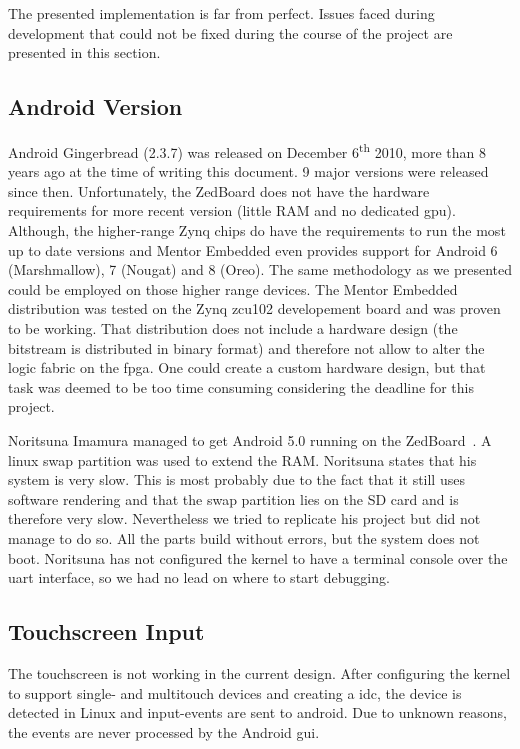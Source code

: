 The presented implementation is far from perfect.
Issues faced during development that could not be fixed during the course of the
project are presented in this section.
\subsection{Android Version}\label{ssec:issueandroidversion}
Android Gingerbread (2.3.7) was released on December 6\textsuperscript{th} 2010,
more than 8 years ago at the time of writing this document.
9 major versions were released since then.
Unfortunately, the ZedBoard does not have the hardware requirements for more
recent version (little RAM and no dedicated \gls{gpu}).
Although, the higher-range Zynq chips do have the requirements to run the most
up to date versions and Mentor Embedded even provides support for Android 6
(Marshmallow), 7 (Nougat) and 8 (Oreo).
The same methodology as we presented could be employed on those higher range
devices.
The Mentor Embedded distribution was tested on the Zynq zcu102 developement
board and was proven to be working.
That distribution does not include a hardware design (the bitstream is
distributed in binary format) and therefore not allow to alter the logic fabric
on the \gls{fpga}.
One could create a custom hardware design, but that task was deemed to be too
time consuming considering the deadline for this project.

Noritsuna Imamura managed to get Android 5.0 running on the
ZedBoard~\cite{noritsuna}.
A linux swap partition was used to extend the RAM.
Noritsuna states that his system is very slow.
This is most probably due to the fact that it still uses software rendering and
that the swap partition lies on the SD card and is therefore very slow.
Nevertheless we tried to replicate his project but did not manage to do so.
All the parts build without errors, but the system does not boot.
Noritsuna has not configured the kernel to have a terminal console over the
\gls{uart} interface, so we had no lead on where to start debugging.

\subsection{Touchscreen Input}\label{ssec:issuetouchscreen}
The touchscreen is not working in the current design.
After configuring the kernel to support single- and multitouch devices and
creating a \gls{idc}, the device is detected in Linux and input-events are sent
to android.
Due to unknown reasons, the events are never processed by the Android \gls{gui}.

